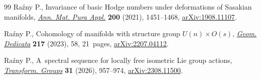\documentclass[pdftex]{sigma}
\numberwithin{equation}{section}
\theoremstyle{definition}
\begin{document}
\begin{thebibliography}{99}
Ra\'zny P., Invariance of basic {H}odge numbers under deformations of
 {S}asakian manifolds,
 \href{https://doi.org/10.1007/s10231-020-01044-8}{\textit{Ann. Mat. Pura
 Appl.}} \textbf{200} (2021), 1451--1468,
 \href{http://arxiv.org/abs/1908.11107}{arXiv:1908.11107}.

Ra\'zny P., Cohomology of manifolds with structure group {$U(n) \times O(s)$},
 \href{https://doi.org/10.1007/s10711-023-00796-w}{\textit{Geom. Dedicata}}
 \textbf{217} (2023), 58, 21~pages,
 \href{http://arxiv.org/abs/2207.04112}{arXiv:2207.04112}.

Ra\'zny P., A~spectral sequence for locally free isometric {L}ie group actions,
 \href{https://doi.org/10.1007/s00031-024-09855-2}{\textit{Transform. Groups}}
 \textbf{31} (2026), 957--974,
 \href{http://arxiv.org/abs/2308.11500}{arXiv:2308.11500}.

\end{thebibliography}\LastPageEnding
\end{document}
